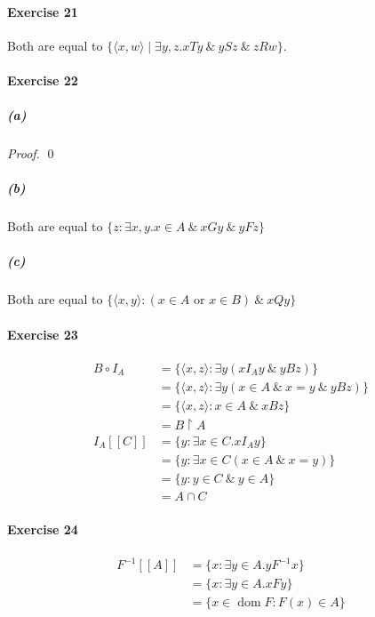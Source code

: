 \documentclass{report}
\newcommand{\dom}{\ensuremath{\operatorname{dom}}}
\begin{document}
    \paragraph{Exercise 21}
    Both are equal to $\{ \langle x,w \rangle \mid \exists y,z. xTy\ \&\ ySz\ \&\ zRw \}$.

    \paragraph{Exercise 22}
    \subparagraph{(a)}
    \begin{proof}
        \pf
        \qed
    \end{proof}
    \subparagraph{(b)}
    Both are equal to $\{ z : \exists x,y. x \in A\ \&\ xGy\ \&\ yFz \}$
    \subparagraph{(c)}
    Both are equal to $\{ \langle x,y \rangle : (x \in A \text{ or } x \in B) \ \&\ xQy \}$

    \paragraph{Exercise 23}
    \begin{align*}
        B \circ I_A & = \{ \langle x,z \rangle : \exists y(xI_Ay \ \&\ yBz) \} \\
        & = \{ \langle x,z \rangle : \exists y(x \in A \ \&\ x = y \ \&\ yBz) \} \\
        & = \{ \langle x,z \rangle : x \in A \ \&\ xBz \} \\
        & = B \restriction A \\
        I_A[\![C]\!] & = \{ y : \exists x \in C. xI_Ay \} \\
        & = \{ y : \exists x \in C (x \in A \ \&\ x = y) \} \\
        & = \{ y : y \in C \ \&\ y \in A \} \\
        & = A \cap C
    \end{align*}

    \paragraph{Exercise 24}
    \begin{align*}
        F^{-1}[\![A]\!] & = \{ x : \exists y \in A. yF^{-1}x \} \\
        & = \{ x : \exists y \in A. x F y \} \\
        & = \{ x \in \dom F : F(x) \in A \}
    \end{align*}
\end{document}
